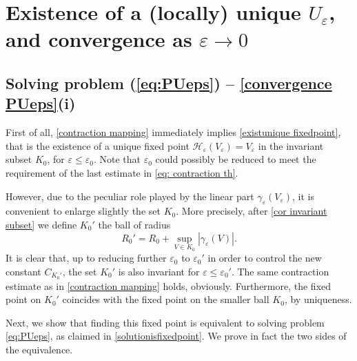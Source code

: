 \documentclass[JEP,XML,SOM,Unicode]{cedram}
\let\mathcal\mathscr
\theoremstyle{plain}
\theoremstyle{definition}
\renewcommand{\H}{\mathcal{H}_\eps}
\let\eps\varepsilon
\begin{document}
\section{Existence of a (locally) unique \texorpdfstring{$U_\eps$}{Ue}, and convergence as \texorpdfstring{$\eps\to 0$}{eo}}

\subsection{Solving problem (\ref{eq:PUeps}) -- \cref{convergence PUeps}(i)}
\label{sec proof reformulation}

First of all, \cref{contraction mapping} immediately implies \cref{existunique fixedpoint}, that is the existence of a unique fixed point $\H(V_\eps) = V_\eps$ in the invariant subset $K_0$, for $\eps \leq \eps_0$. Note that $\eps_0$ could possibly be reduced to meet the requirement of the last estimate in \eqref{eq: contraction th}.

However, due to the peculiar role played by the linear part $\gamma_\eps(V_\eps)$, it is convenient to enlarge slightly the set $K_0$. More precisely, after \cref{cor invariant subset} we define $K_0' $ the ball of radius
\begin{equation}\label{eq:R0'}
R_0' = R_0 + \sup_{V\in K_0}|\gamma_\eps(V)|.
\end{equation}
It is clear that, up to reducing further $\eps_0$ to $\eps_0'$ in order to control the new constant $C_{K_0'}$, the set $K_0'$ is also invariant for $\eps\leq \eps_0'$. The same contraction estimate as in \cref{contraction mapping} holds, obviously. Furthermore, the fixed point on $K_0'$ coincides with the fixed point on the smaller ball $K_0$, by uniqueness.

Next, we show that finding this fixed point is equivalent to solving problem \eqref{eq:PUeps}, as claimed in \cref{solutionisfixedpoint}. We prove in fact the two sides of the equivalence.
\end{document}
